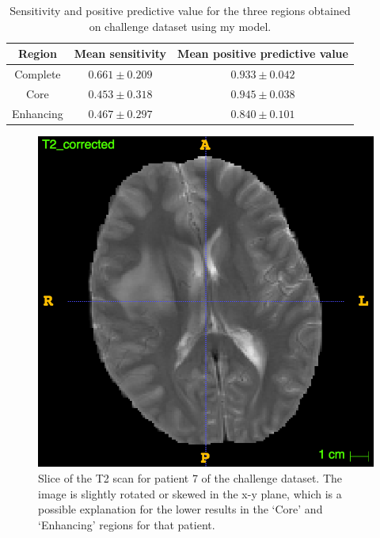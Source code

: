 \documentclass[12pt,a4paper,twoside,openright]{report}
\begin{document}
\begin{table}
\centering	
\begin{tabular}{ c | c | c} 
\textbf{Region} & \textbf{Mean sensitivity } & \textbf{Mean positive predictive value} \\
\hline
Complete &	$0.661 \pm 0.209$ & $0.933 \pm 0.042$ \\
Core & 		$0.453 \pm 0.318$ & $0.945 \pm 0.038$ \\
Enhancing & $0.467 \pm 0.297$ & $0.840 \pm 0.101$ \\
\end{tabular}
\caption{Sensitivity and positive predictive value for the three regions obtained on challenge dataset using my model.}
\label{table:my_model_sensitivity_ppv}
\end{table}

\begin{figure}[h]
	\centering
	\includegraphics[scale = 0.3]{patient7_t2}
	\caption[Slice of the T2 scan for patient 7 of the challenge dataset.]{Slice of the T2 scan for patient 7 of the challenge dataset. The image is slightly rotated or skewed in the x-y plane, which is a possible explanation for the lower results in the `Core' and `Enhancing' regions for that patient.}
	\label{fig:patient_7_t2}
\end{figure}
\end{document}
